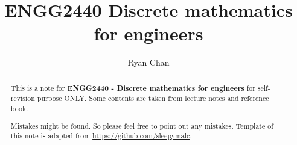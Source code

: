 \documentclass[a4paper]{report}
\author{Ryan Chan}
\title{ENGG2440 Discrete mathematics for engineers}
\begin{document}
\setlength\parindent{0pt}


\maketitle

\newpage

\begin{abstract}
	This is a note for \textbf{ENGG2440 - Discrete mathematics for engineers} for self-revision purpose ONLY. Some contents are taken from lecture notes and reference book. 
	
	Mistakes might be found. So please feel free to point out any mistakes.
	\vfill
	Template of this note is adapted from \href{https://github.com/sleepymalc}{https://github.com/sleepymalc}.
\end{abstract}

\newpage

\tableofcontents

\setlength{\parskip}{5pt}
\end{document}
